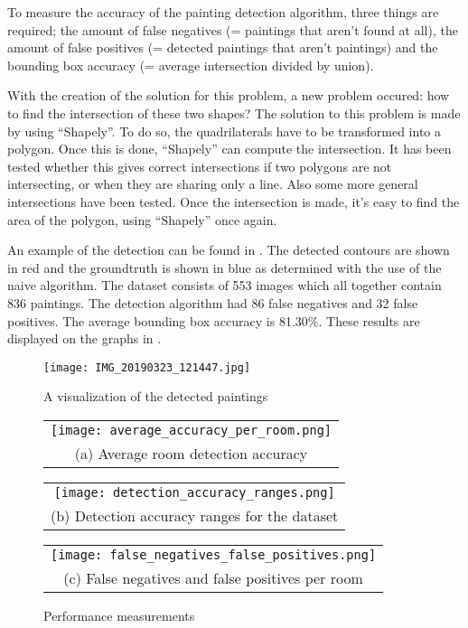 To measure the accuracy of the painting detection algorithm, three things are required; the amount of false negatives (= paintings that aren't found at all), the amount of false positives (= detected paintings that aren't paintings) and the bounding box accuracy (= average intersection divided by union).

With the creation of the solution for this problem, a new problem occured: how to find the intersection of these two shapes? The solution to this problem is made by using ``Shapely''. To do so, the quadrilaterals have to be transformed into a polygon. Once this is done, ``Shapely'' can compute the intersection. It has been tested whether this gives correct intersections if two polygons are not intersecting, or when they are sharing only a line. Also some more general intersections have been tested. Once the intersection is made, it's easy to find the area of the polygon, using ``Shapely'' once again.

An example of the detection can be found in . The detected contours are shown in red and the groundtruth is shown in blue as determined with the use of the naive algorithm. The dataset consists of 553 images which all together contain 836 paintings. The detection algorithm had 86 false negatives and 32 false positives. The average bounding box accuracy is 81.30\%. These results are displayed on the graphs in .

\begin{figure}[ht]
    \texttt{[image: IMG\_20190323\_121447.jpg]}
    \centering
    \caption{A visualization of the detected paintings}
    \label{fig:paiting_detection_with_ground_truth}
\end{figure}

\begin{figure}
    \centering
    \begin{tabular}{@{}c@{}}
        \texttt{[image: average\_accuracy\_per\_room.png]} \\[\abovecaptionskip]
        \small (a) Average room detection accuracy
    \end{tabular}

    \vspace{\floatsep}

    \begin{tabular}{@{}c@{}}
        \texttt{[image: detection\_accuracy\_ranges.png]} \\[\abovecaptionskip]
        \small (b) Detection accuracy ranges for the dataset
    \end{tabular}

    \begin{tabular}{@{}c@{}}
        \texttt{[image: false\_negatives\_false\_positives.png]} \\[\abovecaptionskip]
        \small (c) False negatives and false positives per room
    \end{tabular}

    \caption{Performance measurements}
    \label{fig:performance-measurements}
\end{figure}

